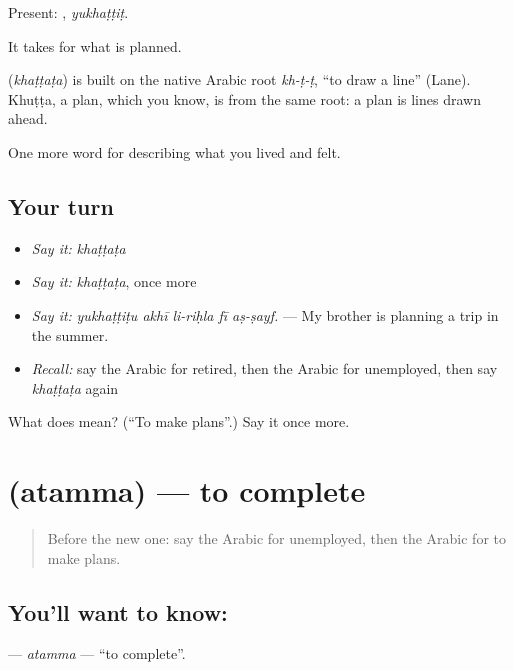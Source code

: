 Present: , \emph{yukhaṭṭiṭ}.

It takes  for what is planned.

\begin{cousinweb}
\textbf{} (\emph{khaṭṭaṭa}) is built on the native Arabic root \emph{kh-ṭ-ṭ}, \textquotedblleft{}to draw a line\textquotedblright{} (Lane). Khuṭṭa, a plan, which you know, is from the same root: a plan is lines drawn ahead.
\end{cousinweb}

\begin{grammarlens}[title={What you've built}]
One more word for describing what you lived and felt.
\end{grammarlens}

\subsection*{Your turn}
\begin{itemize}
\raggedright
  \item \emph{Say it:} \emph{khaṭṭaṭa}
  \item \emph{Say it:} \emph{khaṭṭaṭa}, once more
  \item \emph{Say it:} \emph{yukhaṭṭiṭu akhī li-riḥla fī aṣ-ṣayf.} — My brother is planning a trip in the summer.
  \item \emph{Recall:} say the Arabic for retired, then the Arabic for unemployed, then say \emph{khaṭṭaṭa} again
\end{itemize}

\begin{tcolorbox}[breakable,colback=teal!4,colframe=teal!35!black,title={Before you move on}]
What does  mean? (\textquotedblleft{}To make plans\textquotedblright{}.) Say it once more.
\end{tcolorbox}
\section[\texorpdfstring{\ar{أتم} (atamma)}{أتم (atamma)}]{ (atamma) — to complete}

\label{lesson:AR-C523-atamma}



\begin{quote}
Before the new one: say the Arabic for unemployed, then the Arabic for to make plans.
\end{quote}

\subsection*{You'll want to know: }
\textbf{} — \emph{atamma} — \textquotedblleft{}to complete\textquotedblright{}.

